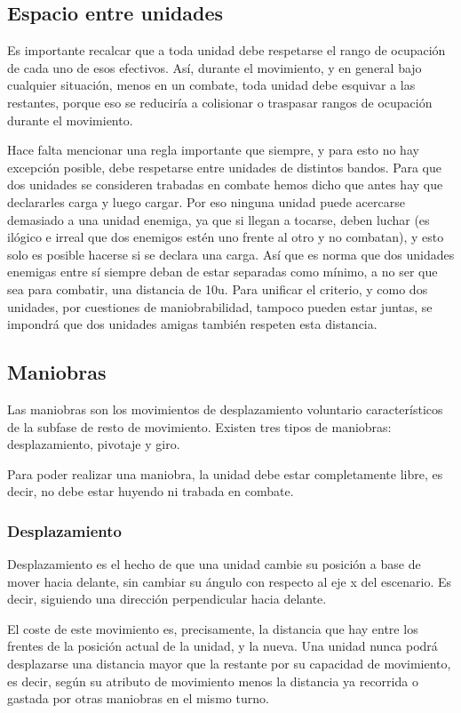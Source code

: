 \subsection*{Espacio entre unidades}
\label{espacio}
Es importante recalcar que a toda unidad debe respetarse el rango de
ocupación de cada uno de esos efectivos. Así, durante el movimiento, y
en general bajo cualquier situación, menos en un combate, toda unidad
debe esquivar a las restantes, porque eso se reduciría a colisionar o traspasar rangos de
ocupación durante el movimiento.

Hace falta mencionar una regla importante que siempre, y para esto no
hay excepción posible, debe respetarse entre unidades de distintos
bandos. Para que dos unidades se consideren trabadas en combate hemos
dicho que antes hay que declararles carga y luego cargar. Por eso
ninguna unidad puede acercarse demasiado a una unidad enemiga, ya que
si llegan a tocarse, deben luchar (es ilógico e irreal que dos
enemigos estén uno frente al otro y no combatan), y esto solo es
posible hacerse si se declara una carga. Así que es norma que dos
unidades enemigas entre sí siempre deban de estar separadas como
mínimo, a no ser que sea para combatir, una distancia de 10u. Para
unificar el criterio, y como dos unidades, por cuestiones de
maniobrabilidad, tampoco pueden estar juntas, se impondrá que dos
unidades amigas también respeten esta distancia.

\subsection*{Maniobras}
\label{maniobras}
Las maniobras son los movimientos de desplazamiento voluntario
característicos de la subfase de resto de movimiento. Existen tres
tipos de maniobras: desplazamiento, pivotaje y giro.

Para poder realizar una maniobra, la unidad debe estar completamente
libre, es decir, no debe estar huyendo ni trabada en combate.

\subsubsection*{Desplazamiento}
\label{desplazamiento}
Desplazamiento es el hecho de que una unidad cambie su posición a base
de mover hacia delante, sin cambiar su ángulo con respecto al eje x
del escenario. Es decir, siguiendo una dirección perpendicular hacia
delante.

El coste de este movimiento es, precisamente, la distancia que hay
entre los frentes de la posición actual de la unidad, y la nueva. Una
unidad nunca podrá desplazarse una distancia mayor que la restante por
su capacidad de movimiento, es decir, según su atributo de movimiento
menos la distancia ya recorrida o gastada por otras maniobras en el
mismo turno.

